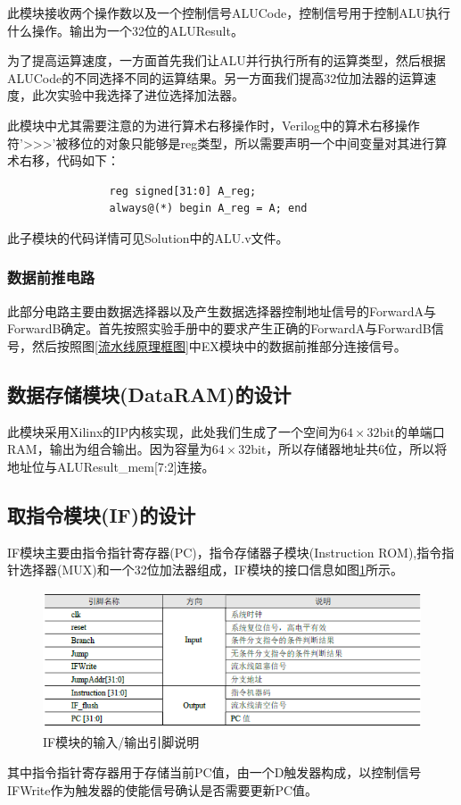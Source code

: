 \documentclass{../source/zjureport}
\begin{document}
            此模块接收两个操作数以及一个控制信号ALUCode，控制信号用于控制ALU执行什么操作。输出为一个32位的ALUResult。

            为了提高运算速度，一方面首先我们让ALU并行执行所有的运算类型，然后根据ALUCode的不同选择不同的运算结果。另一方面我们提高32位加法器的运算速度，此次实验中我选择了进位选择加法器。

            此模块中尤其需要注意的为进行算术右移操作时，Verilog中的算术右移操作符'>>>'被移位的对象只能够是reg类型，所以需要声明一个中间变量对其进行算术右移，代码如下：
            \begin{lstlisting}
                reg signed[31:0] A_reg;
                always@(*) begin A_reg = A; end
            \end{lstlisting}

            此子模块的代码详情可见Solution中的ALU.v文件。

            \subsubsection{数据前推电路}
            此部分电路主要由数据选择器以及产生数据选择器控制地址信号的ForwardA与ForwardB确定。首先按照实验手册中的要求产生正确的ForwardA与ForwardB信号，然后按照图\ref{流水线原理框图}中EX模块中的数据前推部分连接信号。

            \subsection{数据存储模块(DataRAM)的设计}
            此模块采用Xilinx的IP内核实现，此处我们生成了一个空间为$64\times32$bit的单端口RAM，输出为组合输出。因为容量为$64\times32$bit，所以存储器地址共6位，所以将地址位与ALUResult_mem[7:2]连接。

        \subsection{取指令模块(IF)的设计}
        IF模块主要由指令指针寄存器(PC)，指令存储器子模块(Instruction ROM),指令指针选择器(MUX)和一个32位加法器组成，IF模块的接口信息如图\ref{IF模块接口信息}所示。
        \begin{figure}[H]
            \centering
            \includegraphics[]{figure/IF接口信息.png}
            \caption{IF模块的输入/输出引脚说明}
            \label{IF模块接口信息}
        \end{figure}
        其中指令指针寄存器用于存储当前PC值，由一个D触发器构成，以控制信号IFWrite作为触发器的使能信号确认是否需要更新PC值。
        
\end{document}
